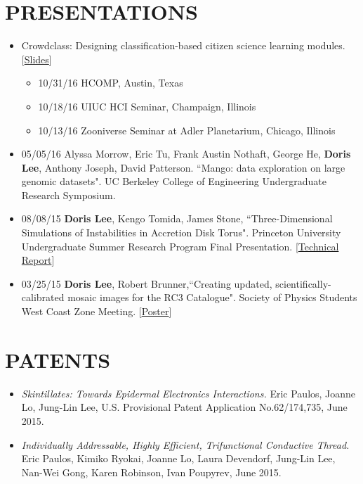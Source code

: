 \documentclass{res}
\begin{document}
\begin{resume}
\section{PRESENTATIONS}
\begin{itemize}
\item Crowdclass: Designing classification-based citizen science learning modules. [\href{http://dorisjunglinlee.com/files/crowdclass_slides.pdf}{Slides}]
	\begin{itemize}[label={$\circ$}]
	\item 10/31/16 HCOMP, Austin, Texas
	\item 10/18/16 UIUC HCI Seminar, Champaign, Illinois
	\item 10/13/16 Zooniverse Seminar at Adler Planetarium, Chicago, Illinois
	\end{itemize}
\item 05/05/16 Alyssa Morrow, Eric Tu, Frank Austin Nothaft, George He, \textbf{Doris Lee},  Anthony Joseph, David Patterson. ``Mango: data exploration on large genomic datasets". UC Berkeley College of Engineering Undergraduate Research Symposium.
\item 08/08/15 \textbf{Doris Lee}, Kengo Tomida, James Stone, ``Three-Dimensional Simulations of Instabilities in Accretion Disk Torus". Princeton University Undergraduate Summer Research Program Final Presentation. [\href{http://dorisjunglinlee.com/files/PrincetonUSRPreport.pdf}{Technical Report}]
\item 03/25/15 \textbf{Doris Lee}, Robert Brunner,``Creating updated, scientifically-calibrated mosaic images for the RC3 Catalogue". Society of Physics Students West Coast Zone Meeting. [\href{http://dorisjunglinlee.com/files/rc3_poster_sps_zone_meeting.pdf}{Poster}]
\end{itemize}
\section{PATENTS}
\begin{itemize}
\item \textit{Skintillates: Towards Epidermal Electronics Interactions.} Eric Paulos, Joanne Lo, Jung-Lin Lee, U.S. Provisional Patent Application No.62/174,735, June 2015.
\item \textit{Individually Addressable, Highly Efficient, Trifunctional Conductive Thread.} Eric Paulos, Kimiko Ryokai, Joanne Lo, Laura Devendorf, Jung-Lin Lee, Nan-Wei Gong, Karen Robinson, Ivan Poupyrev, June 2015.
\end{itemize}

\end{resume}
\end{document}
